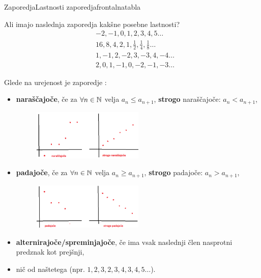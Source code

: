 \begin{priprava}{}{}{Zaporedja}{Lastnosti zaporedja}{frontalna}{tabla}


Ali imajo naslednja zaporedja kakšne posebne lastnosti? 
\begin{align*}
    & -2, -1, 0, 1, 2, 3, 4, 5 \ldots \\
    & 16, 8, 4, 2, 1, \frac{1}{2}, \frac{1}{4}, \frac{1}{8} \ldots \\
    & 1, -1, 2, -2, 3, -3, 4, -4 \ldots \\
    & 2, 0, 1, -1, 0, -2, -1, -3 \ldots
\end{align*}


Glede na urejenost je zaporedje :
\begin{itemize}
    \item \textbf{naraščajoče}, če za $ \forall n \in \mathbb{N} $ velja $ a_n \leq a_{n+1} $,
    \subitem \textbf{strogo} naraščajoče: $ a_n < a_{n+1} $,
    \begin{figure}[h]
        \centering
        \includegraphics[width=0.5\textwidth]{slike/narascajoce.png}
    \end{figure}
    \item \textbf{padajoče}, če za $ \forall n \in \mathbb{N} $ velja $ a_n \geq a_{n+1} $,
    \subitem \textbf{strogo} padajoče: $ a_n > a_{n+1} $,
    \begin{figure}[h]
        \centering
        \includegraphics[width=0.5\textwidth]{slike/padajoce.png}
    \end{figure}
    \item \textbf{alternirajoče/spreminjajoče}, če ima vsak naslednji člen nasprotni predznak kot prejšnji,
    \item nič od naštetega (npr. $ 1, 2, 3, 2, 3, 4, 3, 4, 5 \ldots $).
\end{itemize}


\end{priprava}
